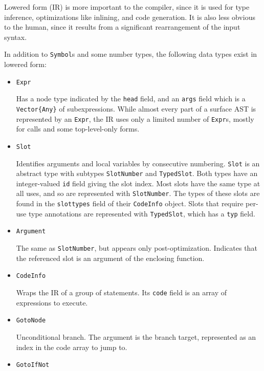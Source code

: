 Lowered form (IR) is more important to the compiler, since it is used for type inference, optimizations like inlining, and code generation. It is also less obvious to the human, since it results from a significant rearrangement of the input syntax.



In addition to \texttt{Symbol}s and some number types, the following data types exist in lowered form:



\begin{itemize}
\item \texttt{Expr}

Has a node type indicated by the \texttt{head} field, and an \texttt{args} field which is a \texttt{Vector\{Any\}} of subexpressions. While almost every part of a surface AST is represented by an \texttt{Expr}, the IR uses only a limited number of \texttt{Expr}s, mostly for calls and some top-level-only forms.


\item \texttt{Slot}

Identifies arguments and local variables by consecutive numbering. \texttt{Slot} is an abstract type with subtypes \texttt{SlotNumber} and \texttt{TypedSlot}. Both types have an integer-valued \texttt{id} field giving the slot index. Most slots have the same type at all uses, and so are represented with \texttt{SlotNumber}. The types of these slots are found in the \texttt{slottypes} field of their \texttt{CodeInfo} object. Slots that require per-use type annotations are represented with \texttt{TypedSlot}, which has a \texttt{typ} field.


\item \texttt{Argument}

The same as \texttt{SlotNumber}, but appears only post-optimization. Indicates that the referenced slot is an argument of the enclosing function.


\item \texttt{CodeInfo}

Wraps the IR of a group of statements. Its \texttt{code} field is an array of expressions to execute.


\item \texttt{GotoNode}

Unconditional branch. The argument is the branch target, represented as an index in the code array to jump to.


\item \texttt{GotoIfNot}


\end{itemize}
